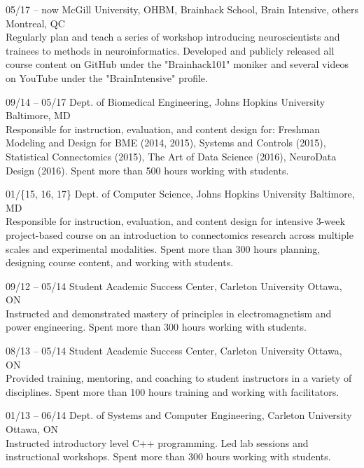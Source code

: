 \documentclass[]{friggeri-cv} %
\begin{document}
\begin{entrylist}
\entry
{05/17 -- now}
{McGill University, OHBM, Brainhack School, Brain Intensive, others}
{Montreal, QC}
{ \\
Regularly plan and teach a series of workshop introducing neuroscientists and trainees to methods in neuroinformatics.
Developed and publicly released all course content on GitHub under the "Brainhack101" moniker and several videos on
YouTube under the "BrainIntensive" profile.}

\entry
{09/14 -- 05/17}
{Dept. of Biomedical Engineering, Johns Hopkins University}
{Baltimore, MD}
{ \\
Responsible for instruction, evaluation, and content design for: Freshman Modeling and Design
for BME (2014, 2015), Systems and Controls (2015), Statistical Connectomics (2015), The Art of
Data Science (2016), NeuroData Design (2016). Spent more than 500 hours working with students.}

\entry
{01/\{15, 16, 17\}}
{Dept. of Computer Science, Johns Hopkins University}
{Baltimore, MD}
{\\
Responsible for instruction, evaluation, and content design for intensive 3-week project-based course on an
introduction to connectomics research across multiple scales and experimental modalities. Spent more than 300 hours
planning, designing course content, and working with students.}

\entry
{09/12 -- 05/14}
{Student Academic Success Center, Carleton University}
{Ottawa, ON}
{\\
Instructed and demonstrated mastery of principles in electromagnetism and power engineering. Spent more than 300 hours
working with students.}
\end{entrylist}

\begin{entrylist}
\entry
{08/13 -- 05/14}
{Student Academic Success Center, Carleton University}
{Ottawa, ON}
{\\
Provided training, mentoring, and coaching to student instructors in a variety of disciplines. Spent more than 100
hours training and working with facilitators.}

\entry
{01/13 -- 06/14}
{Dept. of Systems and Computer Engineering, Carleton University}
{Ottawa, ON}
{\\
Instructed introductory level C++ programming. Led lab sessions and instructional workshops. Spent more than 300 hours
working with students.}
\end{entrylist}
\end{document}
